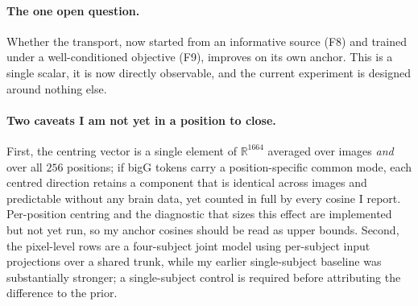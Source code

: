 \documentclass[11pt,a4paper]{article}
\newcommand{\R}{\mathbb{R}}
\theoremstyle{plain}
\theoremstyle{remark}
\begin{document}
\paragraph{The one open question.} Whether the transport, now started from an
informative source (F8) and trained under a well-conditioned objective (F9),
improves on its own anchor. This is a single scalar, it is now directly
observable, and the current experiment is designed around nothing else.

\paragraph{Two caveats I am not yet in a position to close.}
First, the centring vector is a single element of $\R^{1664}$ averaged over
images \emph{and} over all $256$ positions; if bigG tokens carry a
position-specific common mode, each centred direction retains a component that is
identical across images and predictable without any brain data, yet counted in
full by every cosine I report. Per-position centring and the diagnostic that
sizes this effect are implemented but not yet run, so my anchor cosines should be
read as upper bounds. Second, the pixel-level rows are a four-subject joint model
using per-subject input projections over a shared trunk, while my earlier
single-subject baseline was substantially stronger; a single-subject control is
required before attributing the difference to the prior.
\end{document}
